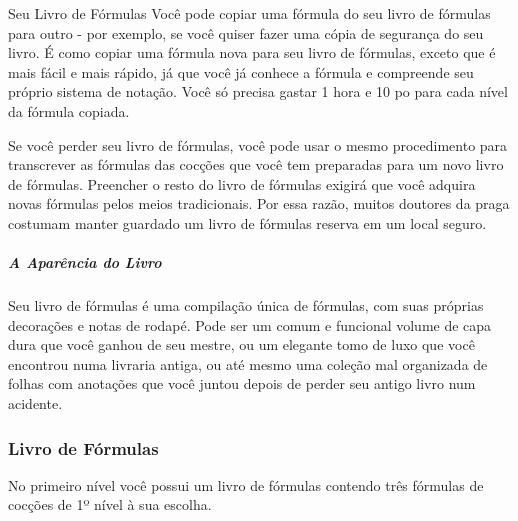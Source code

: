 \documentclass[letterpaper,twocolumn,openany]{dndbook}
\begin{document}
\begin{paperbox}[float=!b]{Seu Livro de Fórmulas}
		Você pode copiar uma fórmula do seu livro de fórmulas para outro - por exemplo, se você quiser fazer uma cópia de segurança do seu livro. É como copiar uma fórmula nova para seu livro de fórmulas, exceto que é mais fácil e mais rápido, já que você já conhece a fórmula e compreende seu próprio sistema de notação. Você só precisa gastar 1 hora e 10 po para cada nível da fórmula copiada.
		\par Se você perder seu livro de fórmulas, você pode usar o mesmo procedimento para transcrever as fórmulas das cocções que você tem preparadas para um novo livro de fórmulas. Preencher o resto do livro de fórmulas exigirá que você adquira novas fórmulas pelos meios tradicionais. Por essa razão, muitos doutores da praga costumam manter guardado um livro de fórmulas reserva em um local seguro.
		\subparagraph{A Aparência do Livro} Seu livro de fórmulas é uma compilação única de fórmulas, com suas próprias decorações e notas de rodapé. Pode ser um comum e funcional volume de capa dura que você ganhou de seu mestre, ou um elegante tomo de luxo que você encontrou numa livraria antiga, ou até mesmo uma coleção mal organizada de folhas com anotações que você juntou depois de perder seu antigo livro num acidente.
	\end{paperbox}

	\subsubsection{Livro de Fórmulas}
	No primeiro nível você possui um livro de fórmulas contendo três fórmulas de cocções de 1º nível à sua escolha.
	
\end{document}
